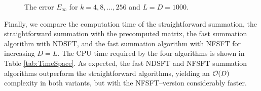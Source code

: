 \documentclass[11pt,a4paper,twoside,bibtotoc]{scrartcl}
\theoremstyle{plain}
\theoremstyle{definition}
\theoremstyle{remark}
\numberwithin{equation}{section}
\numberwithin{table}{section}
\numberwithin{figure}{section}
\begin{document}
\begin{figure}[tb]
  \centering
  \hfill
  \caption{The error $E_{\infty}$ for $k = 4,8,\ldots,256$ and $L = D = 1000$.}
  \label{Figure:PoissonTest}
\end{figure}

Finally, we compare the computation time of the straightforward summation, the
straightforward summation with the precomputed matrix, the fast summation
algorithm with NDSFT, and the fast summation algorithm with NFSFT for
increasing $D=L$. 
The CPU time required by the four algorithms is shown in Table
\ref{tab:TimeSpace}. 
As expected, the fast NDSFT and NFSFT summation algorithms outperform the 
straightforward algorithms, yielding an ${\cal O}(D)$ complexity in both 
variants, but with the NFSFT--version considerably faster.
\end{document}
